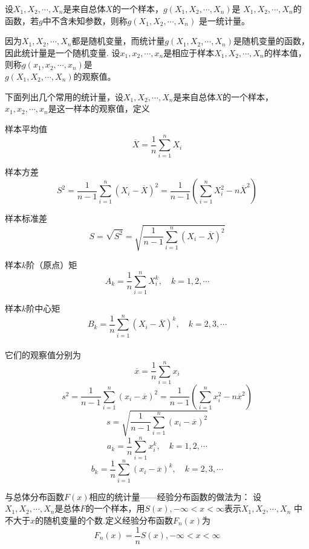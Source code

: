 \begin{definition}
        设$X_1,X_2,\cdots,X_n$是来自总体$X$的一个样本，$g(X_1,X_2,\cdots,X_n)$是
        $X_1,X_2,\cdots,X_n$的函数，若$g$中不含未知参数，则称$g(X_1,X_2,\cdots,X_n)$
        是一{\heiti 统计量}。

        因为$X_1,X_2,\cdots,X_n$都是随机变量，而统计量$g(X_1,X_2,\cdots,X_n)$是随机变量的函数，因此统计量是一个随机变量.
        设$x_1,x_2,\cdots,x_n$是相应于样本$X_1,X_2,\cdots,X_n$的样本值，
        则称$g(x_1,x_2,\cdots,x_n)$是\\$g(X_1,X_2,\cdots,X_n)$的观察值。

        下面列出几个常用的统计量，设$X_1,X_2,\cdots,X_n$是来自总体$X$的一个样本，$x_1,x_2,\cdots,x_n$是这一样本的观察值，定义

        {\heiti 样本平均值} $$\overline{X}=\frac{1}{n}\sum_{i=1}^nX_i$$

        {\heiti 样本方差}$$S^2=\frac{1}{n-1}\sum_{i=1}^n{(X_i-\overline{X})}^2=\frac{1}{n-1}(\sum_{i=1}^nX_i^2-n\overline{X}^2)$$

        {\heiti 样本标准差}$$S=\sqrt{S^2}=\sqrt{\frac{1}{n-1}\sum_{i=1}^n{(X_i-\overline{X})}^2}$$

        {\heiti 样本$k$阶（原点）矩}$$A_k=\frac{1}{n}\sum_{i=1}^nX_i^k,\quad k=1,2,\cdots$$

        {\heiti 样本$k$阶中心矩}$$B_k=\frac{1}{n}\sum_{i=1}^n{(X_i-\overline{X})}^k,\quad k=2,3,\cdots$$\\
        它们的观察值分别为
        $$\overline{x}=\frac{1}{n}\sum_{i=1}^nx_i$$
        $$s^2=\frac{1}{n-1}\sum_{i=1}^n{(x_i-\overline{x})}^2=\frac{1}{n-1}(\sum_{i=1}^nx_i^2-n\overline{x}^2)$$
        $$s=\sqrt{\frac{1}{n-1}\sum_{i=1}^n{(x_i-\overline{x})}^2}$$
        $$a_k=\frac{1}{n}\sum_{i=1}^nx_i^k,\quad k=1,2,\cdots$$
        $$b_k=\frac{1}{n}\sum_{i=1}^n{(x_i-\overline{x})}^k,\quad k=2,3,\cdots$$
\end{definition}


\begin{definition}[经验分布函数]
    与总体分布函数$F(x)$相应的统计量——经验分布函数的做法为：
    设$X_1,X_2,\cdots,X_n$是总体$F$的一个样本，用$S(x),-\infty<x<\infty$表示$X_1,X_2,\cdots,X_n$
    中不大于$x$的随机变量的个数.定义经验分布函数$F_n(x)$为
    $$F_n(x)=\frac{1}{n}S(x),-\infty<x<\infty$$
\end{definition}

